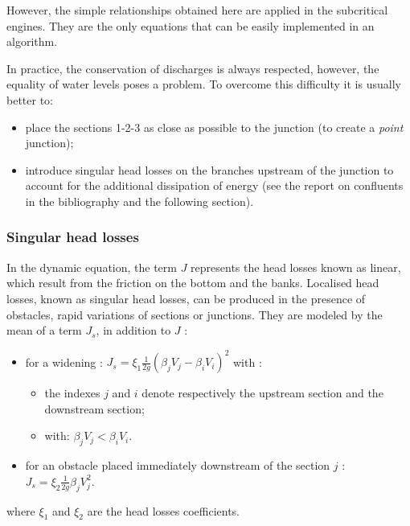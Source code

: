 \vspace{0.5cm}

However, the simple relationships obtained here are applied in the subcritical engines. They are the only equations that can be easily implemented in an algorithm.

\vspace{0.5cm}

In practice, the conservation of discharges is always respected, however, the equality of water levels poses a problem. To overcome this difficulty it is usually better to:
\begin{itemize}
 \item place the sections 1-2-3 as close as possible to the junction (to create a \textit{point} junction);
 \item introduce singular head losses on the branches upstream of the junction to account for the additional dissipation of energy (see the report on confluents in the bibliography and the following section).
\end{itemize}

\subsubsection{Singular head losses}

In the dynamic equation, the term $J$ represents the head losses known as linear, which result from the friction on the bottom and the banks. Localised head losses, known as singular head losses, can be produced in the presence of obstacles, rapid variations of sections or junctions. 
They are modeled by the mean of a term $J_s$, in addition to $J$ :
\begin{itemize}
 \item for a widening : $J_s = \xi_1 \frac{1}{2 g}(\beta_j V_j - \beta_i V_i)^2$ with :
   \begin{itemize}
     \item the indexes $j$ and $i$ denote respectively the upstream section and the downstream section;
     \item with: $\beta_j V_j < \beta_i V_i$.
   \end{itemize}
 \item for an obstacle placed immediately downstream of the section $j$ : \\ $J_s = \xi_2 \frac{1}{2g} \beta_j V_{j}^2$.
\end{itemize}
\vspace{0.5cm}
where $\xi_1$ and $\xi_2$ are the head losses coefficients.

